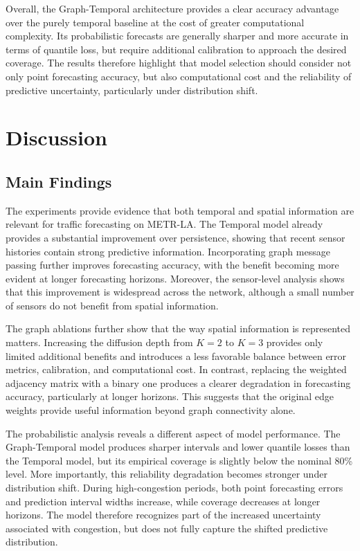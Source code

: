 Overall, the Graph-Temporal architecture provides a clear accuracy advantage
over the purely temporal baseline at the cost of greater computational
complexity. Its probabilistic forecasts are generally sharper and more
accurate in terms of quantile loss, but require additional calibration to
approach the desired coverage. The results therefore highlight that model
selection should consider not only point forecasting accuracy, but also
computational cost and the reliability of predictive uncertainty,
particularly under distribution shift.

\section{Discussion}
\label{sec:discussion}

\subsection{Main Findings}
\label{subsec:main_findings}

The experiments provide evidence that both temporal and spatial information
are relevant for traffic forecasting on METR-LA. The Temporal model already
provides a substantial improvement over persistence, showing that recent
sensor histories contain strong predictive information. Incorporating graph
message passing further improves forecasting accuracy, with the benefit
becoming more evident at longer forecasting horizons. Moreover, the
sensor-level analysis shows that this improvement is widespread across the
network, although a small number of sensors do not benefit from spatial
information.

The graph ablations further show that the way spatial information is
represented matters. Increasing the diffusion depth from $K=2$ to $K=3$
provides only limited additional benefits and introduces a less favorable
balance between error metrics, calibration, and computational cost. In
contrast, replacing the weighted adjacency matrix with a binary one produces
a clearer degradation in forecasting accuracy, particularly at longer
horizons. This suggests that the original edge weights provide useful
information beyond graph connectivity alone.

The probabilistic analysis reveals a different aspect of model performance.
The Graph-Temporal model produces sharper intervals and lower quantile losses
than the Temporal model, but its empirical coverage is slightly below the
nominal 80\% level. More importantly, this reliability degradation becomes
stronger under distribution shift. During high-congestion periods, both point
forecasting errors and prediction interval widths increase, while coverage
decreases at longer horizons. The model therefore recognizes part of the
increased uncertainty associated with congestion, but does not fully capture
the shifted predictive distribution.

